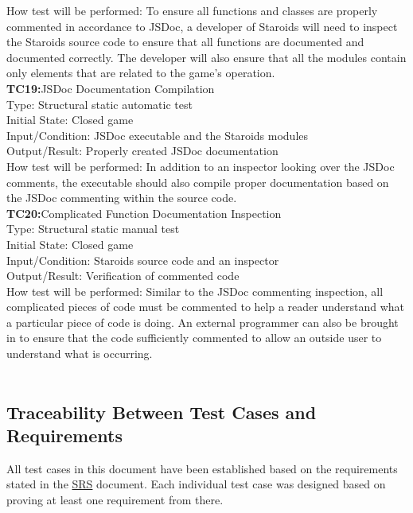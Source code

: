 \documentclass[12pt, titlepage]{article}
\begin{document}
How test will be performed: To ensure all functions and classes are properly commented in accordance to JSDoc, a developer of Staroids will need to inspect the Staroids source code to ensure that all functions are documented and documented correctly. The developer will also ensure that all the modules contain only elements that are related to the game's operation.\\

\textbf{TC19:}JSDoc Documentation Compilation\\

Type: Structural static automatic test\\

Initial State: Closed game\\

Input/Condition: JSDoc executable and the Staroids modules\\

Output/Result: Properly created JSDoc documentation\\

How test will be performed: In addition to an inspector looking over the JSDoc comments, the executable should also compile proper documentation based on the JSDoc commenting within the source code.\\

\textbf{TC20:}Complicated Function Documentation Inspection\\

Type: Structural static manual test\\

Initial State: Closed game\\

Input/Condition: Staroids source code and an inspector\\

Output/Result: Verification of commented code\\

How test will be performed: Similar to the JSDoc commenting inspection, all complicated pieces of code must be commented to help a reader understand what a particular piece of code is doing. An external programmer can also be brought in to ensure that the code sufficiently commented to allow an outside user to understand what is occurring.\\\\


\subsection{Traceability Between Test Cases and Requirements}
All test cases in this document have been established based on the requirements stated in the \href{https://gitlab.cas.mcmaster.ca/nagyj2/Staroids/blob/master/Doc/SRS/SRS.pdf}{SRS} document. Each individual test case was designed based on proving at least one requirement from there.
\end{document}
